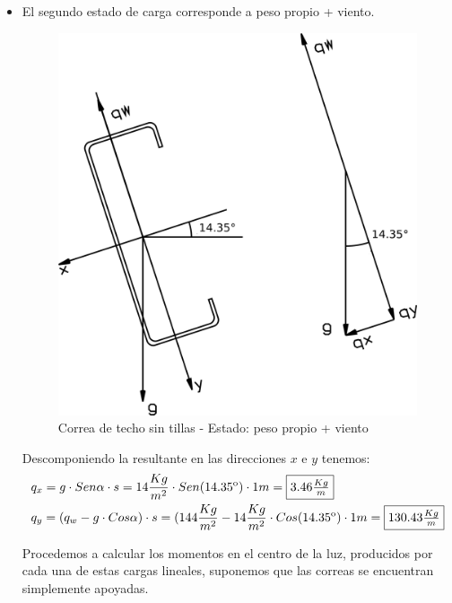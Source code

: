 \begin{enumerate}
\begin{itemize}
\newpage
\item El segundo estado de carga corresponde a peso propio + viento.

\begin{figure}[H]
\begin{center}
     \includegraphics[scale = 1]{chapters/chapter_3/images/figura2.png}
\caption{Correa de techo sin tillas - Estado: peso propio + viento}
\end{center}
\end{figure}

Descomponiendo la resultante en las direcciones $x$ e $y$ tenemos:
\begin{align*}
& q_x=g \cdot Sen \alpha \cdot s = 14 \frac{Kg}{m^2} \cdot Sen(14.35\textsuperscript{o}) \cdot 1m= \framebox{$3.46 \frac{Kg}{m}$}\\
& q_y=(q_w - g \cdot Cos \alpha) \cdot s = (144 \frac{Kg}{m^2} - 14 \frac{Kg}{m^2} \cdot Cos(14.35\textsuperscript{o}) \cdot 1m= \framebox{$130.43 \frac{Kg}{m}$}
\end{align*}

Procedemos a calcular los momentos en el centro de la luz, producidos por cada una de estas cargas lineales, suponemos que las correas se encuentran simplemente apoyadas.


\end{itemize}
\end{enumerate}

